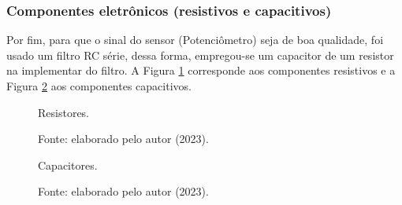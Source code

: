 \newpage
\subsubsection{Componentes eletrônicos (resistivos e capacitivos)}

Por fim, para que o sinal do sensor (Potenciômetro) seja de boa qualidade, foi usado um filtro RC série, dessa forma, empregou-se um capacitor de um resistor na implementar do filtro. A Figura \ref{fig3:image_09} corresponde aos componentes resistivos e a Figura \ref{fig3:image_10} aos componentes capacitivos.


\begin{figure}[!h]
         \centering
         \caption{Resistores.}
         \caption*{Fonte: elaborado pelo autor (2023).}
         \label{fig3:image_09}
\end{figure}

\begin{figure}[!h]
         \centering
         \caption{Capacitores.}
         \caption*{Fonte: elaborado pelo autor (2023).}
         \label{fig3:image_10}
\end{figure}


